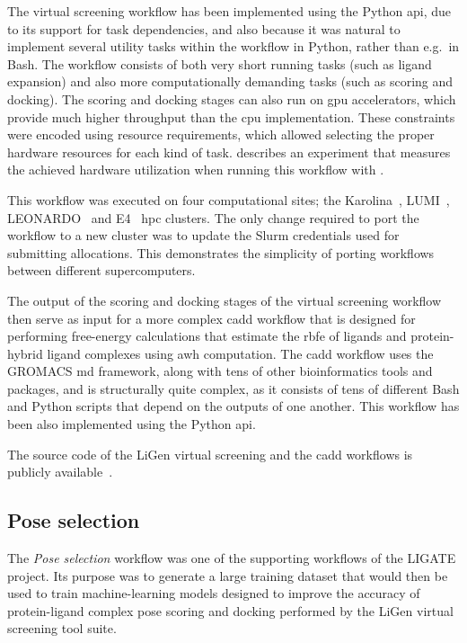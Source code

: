 The virtual screening workflow has been implemented using the \hyperqueue{} Python
\gls{api}, due to its support for task dependencies, and also because it was natural
to implement several utility tasks within the workflow in Python, rather than e.g.\ in Bash. The
workflow consists of both very short running tasks (such as ligand expansion) and also more
computationally demanding tasks (such as scoring and docking). The scoring and docking stages can
also run on \gls{gpu} accelerators, which provide much higher throughput than the
\gls{cpu} implementation. These constraints were encoded using
\hq{} resource requirements, which allowed selecting the proper hardware
resources for each kind of task.  describes an experiment that measures the
achieved hardware utilization when running this workflow with \hyperqueue{}.

This workflow was executed on four computational sites; the Karolina~\cite{karolina},
LUMI~\cite{lumi}, LEONARDO~\cite{leonardo} and E4~\cite{e4}
\gls{hpc} clusters. The only change required to port the workflow to a new cluster
was to update the Slurm credentials used for submitting allocations. This demonstrates the
simplicity of porting \hyperqueue{} workflows between different supercomputers.

The output of the scoring and docking stages of the virtual screening workflow then serve as input
for a more complex \gls{cadd} workflow that is designed for performing free-energy
calculations that estimate the \gls{rbfe} of ligands and protein-hybrid ligand
complexes using \gls{awh} computation. The \gls{cadd} workflow uses the
GROMACS \gls{md} framework, along with tens of other bioinformatics tools and
packages, and is structurally quite complex, as it consists of tens of different Bash and Python
scripts that depend on the outputs of one another. This workflow has been also implemented using
the \hyperqueue{} Python \gls{api}.

The source code of the LiGen virtual screening and the \gls{cadd} workflows is
publicly available~\cite{cadd-workflow}.

\subsection{Pose selection}
The \emph{Pose selection} workflow was one of the supporting workflows of the LIGATE project. Its
purpose was to generate a large training dataset that would then be used to train machine-learning
models designed to improve the accuracy of protein-ligand complex pose scoring and docking
performed by the LiGen virtual screening tool suite.

